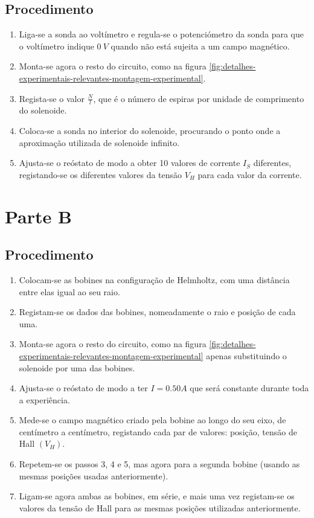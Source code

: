 {\subsection{Procedimento}
\label{subsec:detalhes-experimentais-relevantes-parte1-procedimento}

\begin{enumerate}
    \item Liga-se a sonda ao voltímetro e regula-se o potenciómetro da sonda para que o voltímetro indique $0~V$ quando não está sujeita a um campo magnético.
    \item Monta-se agora o resto do circuito, como na figura \ref{fig:detalhes-experimentais-relevantes-montagem-experimental}.
    \item Regista-se o valor $\frac{N}{l}$, que é o número de espiras por unidade de comprimento do solenoide.
    \item Coloca-se a sonda no interior do solenoide, procurando o ponto onde a aproximação utilizada de solenoide infinito.
    \item Ajusta-se o reóstato de modo a obter 10 valores de corrente $I_S$ diferentes, registando-se os diferentes valores da tensão $V_H$ para cada valor da corrente.
\end{enumerate}

\section{Parte B}
\label{sec:detalhes-experimentais-relevantes-parte2}

\subsection{Procedimento}
\label{subsec:detalhes-experimentais-relevantes-parte2-procedimento}

\begin{enumerate}
    \item Colocam-se as bobines na configuração de Helmholtz, com uma distância entre elas igual ao seu raio.
    \item Registam-se os dados das bobines, nomeadamente o raio e posição de cada uma.
    \item Monta-se agora o resto do circuito, como na figura \ref{fig:detalhes-experimentais-relevantes-montagem-experimental} apenas substituindo o solenoide por uma das bobines.
    \item Ajusta-se o reóstato de modo a ter $I=0.50A$ que será constante durante toda a experiência.
    \item Mede-se o campo magnético criado pela bobine ao longo do seu eixo, de centímetro a centímetro, registando cada par de valores: posição, tensão de Hall $(V_H)$.
    \item Repetem-se os passos 3, 4 e 5, mas agora para a segunda bobine (usando as mesmas posições usadas anteriormente).
    \item Ligam-se agora ambas as bobines, em série, e mais uma vez registam-se os valores da tensão de Hall para as mesmas posições utilizadas anteriormente.
\end{enumerate}

\pagebreak

}

